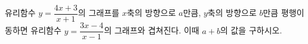 유리함수 $y=\dfrac{4x+3}{x+1}$의 그래프를 $x$축의 방향으로 $a$만큼, $y$축의 방향으로 $b$만큼 평행이동하면 유리함수 $y=\dfrac{3x-4}{x-1}$의 그래프와 겹쳐진다. 이때 $a+b$의 값을 구하시오.

